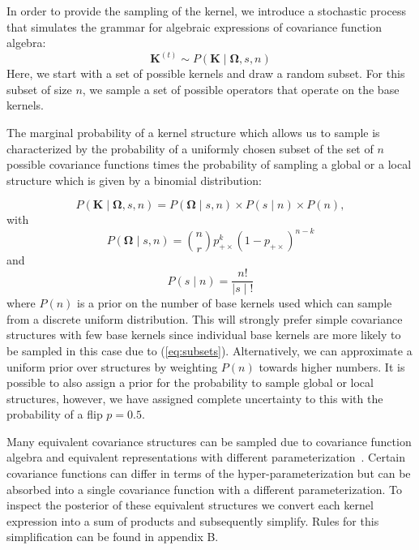 In order to provide the sampling of the kernel, we introduce a stochastic process that simulates the grammar for algebraic expressions of covariance function algebra:
\begin{equation}
\mathbf{K}^{(t)} \sim  P(\mathbf{K} \mid \bm{\Omega},s,n)
\end{equation}
Here, we start with a set of possible kernels and draw a random subset. For this subset of size $n$, we sample a set of possible operators that operate on the base kernels. 

The marginal probability of a kernel structure which allows us to sample  is characterized by the probability of a uniformly chosen subset of the set of $n$ possible covariance functions times the probability of sampling a global or a local structure which is given by a binomial distribution: 

\begin{equation}
P(\mathbf{K} \mid \bm{\Omega},s,n) = P(\bm{\Omega} \mid s,n)\times P(s \mid n) \times P(n),
\end{equation}
with
\begin{equation}
P(\bm{\Omega} \mid s,n)= {n \choose r}  p_{+\times}^k (1 - p_{+\times})^{n-k}
\end{equation}
and
\begin{equation}
\label{eq:subsets}
P(s \mid n) = \frac{n!}{ \mid s \mid !}
\end{equation}
where $P(n)$ is a prior on the number of base kernels used which can sample from a discrete uniform distribution. This will strongly prefer simple covariance structures with few base kernels since individual base kernels are more likely to be sampled in this case due to (\ref{eq:subsets}). Alternatively, we can approximate a uniform prior over structures by weighting $P(n)$ towards higher numbers. It is possible to also assign a prior for the probability to sample global or local structures, however, we have assigned complete uncertainty to this with the probability of a flip $p = 0.5$.



Many equivalent covariance structures can be sampled due to covariance function algebra and equivalent representations with different parameterization~\citep{lloyd2014automatic}. Certain covariance functions can differ in terms of the hyper-parameterization but can be absorbed into a single covariance function with a different parameterization. To inspect the posterior of these equivalent structures we convert each kernel expression into a sum of products and subsequently simplify. Rules for this simplification can be found in appendix B.


